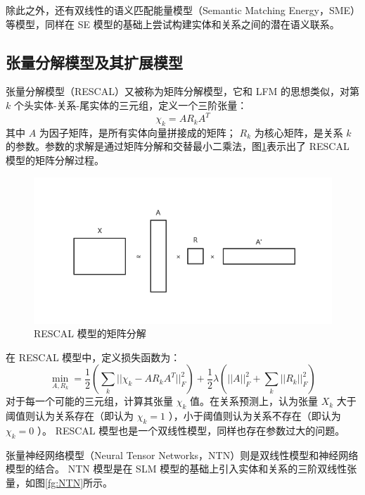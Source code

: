 \documentclass{llncs}
\begin{document}
除此之外，还有双线性的语义匹配能量模型（Semantic Matching Energy，SME）\cite{DBLP:journals/jmlr/BordesGWB12}等模型，同样在 SE 模型的基础上尝试构建实体和关系之间的潜在语义联系。

\subsection{张量分解模型及其扩展模型}

张量分解模型（RESCAL）\cite{DBLP:conf/icml/NickelTK11}又被称为矩阵分解模型，它和 LFM 的思想类似，对第 $k$ 个头实体-关系-尾实体的三元组，定义一个三阶张量：
\begin{displaymath}
\chi_k=AR_kA^T
\end{displaymath}
其中 $A$ 为因子矩阵，是所有实体向量拼接成的矩阵； $R_k$ 为核心矩阵，是关系 $k$ 的参数。参数的求解是通过矩阵分解和交替最小二乘法，图\ref{fg:RESCAL}表示出了 RESCAL 模型的矩阵分解过程。

\begin{figure}
	\centering
	\includegraphics[width=0.8\columnwidth]{figures/RESCAL.png}
	\caption{ RESCAL 模型的矩阵分解}
	\label{fg:RESCAL}
\end{figure}

在 RESCAL 模型中，定义损失函数为：
\begin{displaymath}
\min_{A,R_k}=\frac{1}{2}(\sum_k||\chi_k-AR_kA^T||^2_F)+\frac{1}{2}\lambda(||A||^2_F+\sum_k||R_k||^2_F)
\end{displaymath}
对于每一个可能的三元组，计算其张量 $\chi_k$ 值。在关系预测上，认为张量 $X_k$ 大于阈值则认为关系存在（即认为 $\chi_k=1$ ），小于阈值则认为关系不存在（即认为 $\chi_k=0$ ）。 RESCAL 模型也是一个双线性模型，同样也存在参数过大的问题。

张量神经网络模型（Neural Tensor Networks，NTN）\cite{DBLP:conf/nips/SocherCMN13}则是双线性模型和神经网络模型的结合。 NTN 模型是在 SLM 模型的基础上引入实体和关系的三阶双线性张量，如图\ref{fg:NTN}所示。
\end{document}
